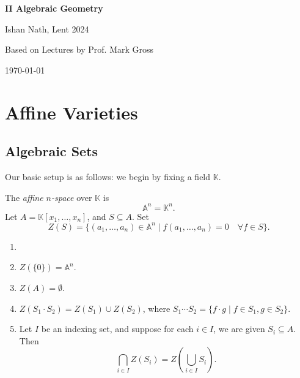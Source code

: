 \documentclass[12pt]{article}
\begin{document}
\hypersetup{pageanchor=false}
\begin{titlepage}
	\begin{center}
		\vspace*{1em}
		\Huge
		\textbf{II Algebraic Geometry}

		\vspace{1em}
		\large
		Ishan Nath, Lent 2024

		\vspace{1.5em}

		\Large

		Based on Lectures by Prof. Mark Gross

		\vspace{1em}

		\large
		\today
	\end{center}
	
\end{titlepage}
\hypersetup{pageanchor=true}

\tableofcontents

\newpage

\section{Affine Varieties}
\label{sec:aff_var}

\subsection{Algebraic Sets}
\label{sub:alg_set}

Our basic setup is as follows: we begin by fixing a field $\mathbb{K}$.

\begin{definition}
	The \emph{affine $n$-space} over $\mathbb{K}$ is
	\[
	\mathbb{A}^{n} = \mathbb{K}^n.
	\]
	Let $A = \mathbb{K}[x_1, \ldots, x_n]$, and $S \subseteq A$. Set
	\[
		Z(S) = \{(a_1, \ldots, a_n) \in \mathbb{A}^n \mid f(a_1, \ldots, a_n) =0 \quad \forall f \in S\}.
	\]
\end{definition}

\begin{proposition}
	\begin{enumerate}[\normalfont(a)]
		\item[]
		\item $Z(\{0\}) = \mathbb{A}^n$.
		\item $Z(A) = \emptyset$.
		\item $Z(S_1 \cdot S_2) = Z(S_1) \cup Z(S_2)$, where $S_1 \cdots S_2 = \{f \cdot g \mid f \in S_1, g \in S_2\}$.
		\item Let $I$ be an indexing set, and suppose for each $i \in I$, we are given $S_i \subseteq A$. Then
			\[
			\bigcap_{i \in I}Z(S_i) = Z \left( \bigcup_{i \in I}S_i \right).
			\]
	\end{enumerate}
\end{proposition}
\end{document}
